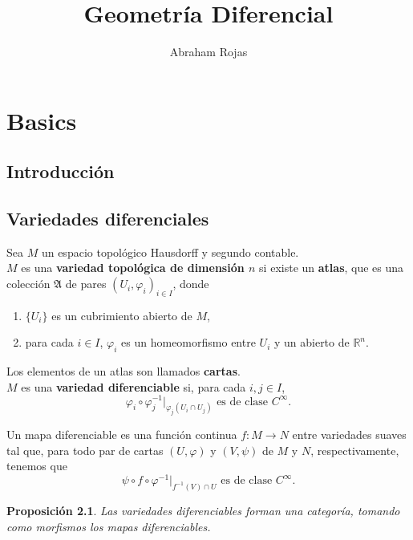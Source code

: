 \documentclass[12pt]{book}
\newtheorem{pro}{Proposición}
\newcommand{\re}{\mathbb{R}}
\begin{document}
	\title{Geometría Diferencial}	
	\author{Abraham Rojas}
	\date{ }
	
	\maketitle
	\tableofcontents
	
	\part{Basics}
	\chapter{Introducción}

\chapter{Variedades diferenciales}


Sea $M$ un espacio topológico Hausdorff y segundo contable.\\

$M$ es una \textbf{variedad topológica de dimensión $n$}  si existe un \textbf{atlas}, que es una colección $\mathfrak{A}$ de pares $(U_i, \varphi_i )_{i\in I}$, donde
\begin{enumerate}
	\item $\{U_i\}$ es un cubrimiento abierto de $M$,
	\item para cada $i\in I$, $\varphi_i$ es un homeomorfismo entre $U_i$ y un abierto de $\re^n $.
\end{enumerate}
Los elementos de un atlas son llamados \textbf{cartas}.\\

$M$ es una \textbf{variedad diferenciable} si, para cada $i,j\in I$, $$\varphi_i \circ \varphi_j^{-1} | _{ \varphi_j(U_i \cap U_j)}  \mbox{ es de clase } C^\infty .$$ 

Un mapa diferenciable es una función continua $f:M \rightarrow N$ entre variedades suaves tal que, para todo par de cartas $(U,\varphi)$ y $(V, \psi)$ de $M$ y $N$, respectivamente, tenemos que $$ \psi \circ  f \circ \varphi ^{-1} |_{ f^{-1}(V) \cap U }  \mbox{ es de clase } C^\infty.$$

\begin{pro}
	Las variedades diferenciables forman una categoría, tomando como morfismos los mapas diferenciables.
\end{pro}
\end{document}
